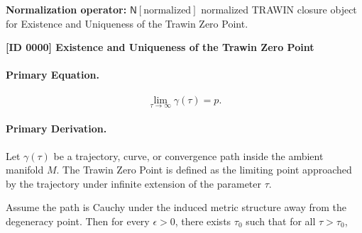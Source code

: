 \begin{minipage}[t]{0.49\linewidth}
\begin{minipage}[t]{0.49\linewidth}
\begin{minipage}[t]{0.49\linewidth}
\begin{minipage}[t]{0.49\linewidth}
\begin{minipage}[t]{0.49\linewidth}
\begin{minipage}[t]{0.49\linewidth}
\begin{minipage}[t]{0.49\linewidth}
\begin{minipage}[t]{0.49\linewidth}
\begin{minipage}[t]{0.49\linewidth}
\begin{minipage}[t]{0.49\linewidth}
\begin{minipage}[t]{0.49\linewidth}
\begin{minipage}[t]{0.49\linewidth}
\begin{minipage}[t]{0.49\linewidth}
\begin{minipage}[t]{0.49\linewidth}
\begin{minipage}[t]{0.49\linewidth}
\begin{minipage}[t]{0.49\linewidth}
\begin{minipage}[t]{0.49\linewidth}
\begin{minipage}[t]{0.49\linewidth}
\begin{minipage}[t]{0.49\linewidth}
\begin{minipage}[t]{0.49\linewidth}
\begin{minipage}[t]{0.49\linewidth}
\begin{minipage}[t]{0.49\linewidth}
\begin{minipage}[t]{0.49\linewidth}
\begin{minipage}[t]{0.49\linewidth}
\begin{minipage}[t]{0.49\linewidth}
\begin{minipage}[t]{0.49\linewidth}
\begin{minipage}[t]{0.49\linewidth}
\begin{minipage}[t]{0.49\linewidth}
\begin{minipage}[t]{0.49\linewidth}
\begin{minipage}[t]{0.49\linewidth}
\begin{minipage}[t]{0.49\linewidth}
\begin{minipage}[t]{0.49\linewidth}
\begin{minipage}[t]{\linewidth}
\noindent\textbf{Normalization operator:} $\mathsf{N}\!\left[\mathrm{normalized}\right]$ normalized TRAWIN closure object for Existence and Uniqueness of the Trawin Zero Point.\par
\endgroup
\end{minipage}

\clearpage
\noindent\textbf{[ID 0000] Existence and Uniqueness of the Trawin Zero Point}\par
\vspace{0.35em}
\paragraph{Primary Equation.}
\begin{equation}
\lim_{\tau\to\infty}\gamma(\tau)=p .
\end{equation}

\paragraph{Primary Derivation.}
Let $\gamma(\tau)$ be a trajectory, curve, or convergence path inside the ambient manifold $M$.  
The Trawin Zero Point is defined as the limiting point approached by the trajectory under infinite extension of the parameter $\tau$.

Assume the path is Cauchy under the induced metric structure away from the degeneracy point. Then for every $\epsilon>0$, there exists $\tau_0$ such that for all $\tau>\tau_0$,


\end{minipage}
\end{minipage}
\end{minipage}
\end{minipage}
\end{minipage}
\end{minipage}
\end{minipage}
\end{minipage}
\end{minipage}
\end{minipage}
\end{minipage}
\end{minipage}
\end{minipage}
\end{minipage}
\end{minipage}
\end{minipage}
\end{minipage}
\end{minipage}
\end{minipage}
\end{minipage}
\end{minipage}
\end{minipage}
\end{minipage}
\end{minipage}
\end{minipage}
\end{minipage}
\end{minipage}
\end{minipage}
\end{minipage}
\end{minipage}
\end{minipage}
\end{minipage}
